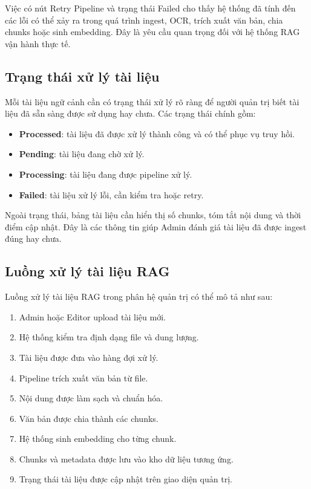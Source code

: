 Việc có nút Retry Pipeline và trạng thái Failed cho thấy hệ thống đã tính đến các lỗi có thể xảy ra trong quá trình ingest, OCR, trích xuất văn bản, chia chunks hoặc sinh embedding. Đây là yêu cầu quan trọng đối với hệ thống RAG vận hành thực tế.

\subsection{Trạng thái xử lý tài liệu}

Mỗi tài liệu ngữ cảnh cần có trạng thái xử lý rõ ràng để người quản trị biết tài liệu đã sẵn sàng được sử dụng hay chưa. Các trạng thái chính gồm:

\begin{itemize}
    \item \textbf{Processed}: tài liệu đã được xử lý thành công và có thể phục vụ truy hồi.
    \item \textbf{Pending}: tài liệu đang chờ xử lý.
    \item \textbf{Processing}: tài liệu đang được pipeline xử lý.
    \item \textbf{Failed}: tài liệu xử lý lỗi, cần kiểm tra hoặc retry.
\end{itemize}

Ngoài trạng thái, bảng tài liệu cần hiển thị số chunks, tóm tắt nội dung và thời điểm cập nhật. Đây là các thông tin giúp Admin đánh giá tài liệu đã được ingest đúng hay chưa.

\subsection{Luồng xử lý tài liệu RAG}

Luồng xử lý tài liệu RAG trong phân hệ quản trị có thể mô tả như sau:

\begin{enumerate}
    \item Admin hoặc Editor upload tài liệu mới.
    \item Hệ thống kiểm tra định dạng file và dung lượng.
    \item Tài liệu được đưa vào hàng đợi xử lý.
    \item Pipeline trích xuất văn bản từ file.
    \item Nội dung được làm sạch và chuẩn hóa.
    \item Văn bản được chia thành các chunks.
    \item Hệ thống sinh embedding cho từng chunk.
    \item Chunks và metadata được lưu vào kho dữ liệu tương ứng.
    \item Trạng thái tài liệu được cập nhật trên giao diện quản trị.
\end{enumerate}

